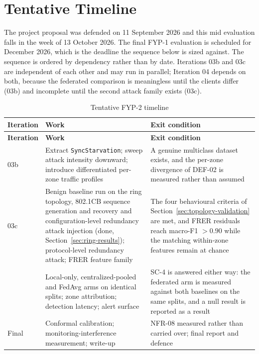\section{Tentative Timeline}
The project proposal was defended on 11 September 2026 and this mid evaluation falls
in the week of 13 October 2026. The final FYP-1 evaluation is scheduled for December
2026, which is the deadline the sequence below is sized against. The sequence is
ordered by dependency rather than by date. Iterations 03b and
03c are independent of each other and may run in parallel; Iteration 04 depends on
both, because the federated comparison is meaningless until the clients differ
(03b) and incomplete until the second attack family exists (03c).

\begin{longtable}{p{} p{} p{}}
\caption{Tentative FYP-2 timeline}\label{tab:timeline}\\
\toprule
\textbf{Iteration} & \textbf{Work} & \textbf{Exit condition} \\
\midrule
\endfirsthead
\toprule
\textbf{Iteration} & \textbf{Work} & \textbf{Exit condition} \\
\midrule
\endhead
03b &
Extract \texttt{SyncStarvation}; sweep attack intensity downward; introduce
differentiated per-zone traffic profiles &
A genuine multiclass dataset exists, and the per-zone divergence of DEF-02 is
measured rather than assumed \\
\addlinespace
03c &
Benign baseline run on the ring topology, 802.1CB sequence generation and recovery and
configuration-level redundancy attack injection (done, Section~\ref{sec:ring-results});
protocol-level redundancy attack; FRER feature family &
The four behavioural criteria of Section~\ref{sec:topology-validation} are met, and FRER residuals reach
macro-F1 $> 0.90$ while the matching within-zone features remain at chance \\
\addlinespace
04 &
Local-only, centralized-pooled and FedAvg arms on identical splits; zone
attribution; detection latency; alert surface &
SC-4 is answered either way: the federated arm is measured against both baselines
on the same splits, and a null result is reported as a result \\
\addlinespace
Final &
Conformal calibration; monitoring-interference measurement; write-up &
NFR-08 measured rather than carried over; final report and defence \\
\bottomrule
\end{longtable}

